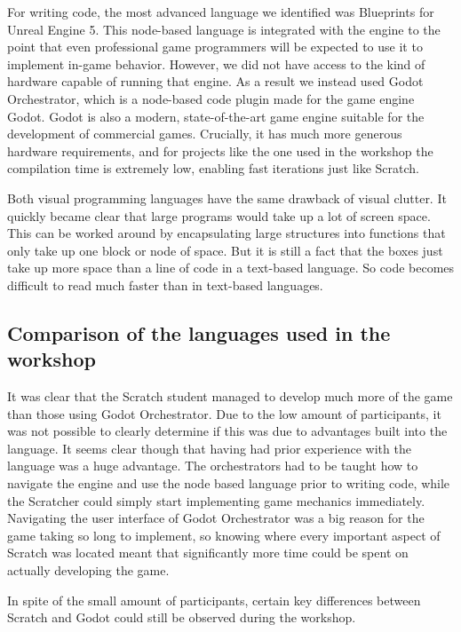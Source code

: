 For writing code, the most advanced language we identified was Blueprints for Unreal Engine 5.
This node-based language is integrated with the engine to the point that even professional game programmers will be expected to use it to implement in-game behavior.
However, we did not have access to the kind of hardware capable of running that engine.
As a result we instead used Godot Orchestrator, which is a node-based code plugin made for the game engine Godot.
Godot is also a modern, state-of-the-art game engine suitable for the development of commercial games.
Crucially, it has much more generous hardware requirements, and for projects like the one used in the workshop the compilation time is extremely low, enabling fast iterations just like Scratch.

Both visual programming languages have the same drawback of visual clutter.
It quickly became clear that large programs would take up a lot of screen space.
This can be worked around by encapsulating large structures into functions that only take up one block or node of space.
But it is still a fact that the boxes just take up more space than a line of code in a text-based language.
So code becomes difficult to read much faster than in text-based languages.

\subsection{Comparison of the languages used in the workshop}
It was clear that the Scratch student managed to develop much more of the game than those using Godot Orchestrator.
Due to the low amount of participants, it was not possible to clearly determine if this was due to advantages built into the language.
It seems clear though that having had prior experience with the language was a huge advantage.
The orchestrators had to be taught how to navigate the engine and use the node based language prior to writing code, while the Scratcher could simply start implementing game mechanics immediately.
Navigating the user interface of Godot Orchestrator was a big reason for the game taking so long to implement, so knowing where every important aspect of Scratch was located meant that significantly more time could be spent on actually developing the game.

In spite of the small amount of participants, certain key differences between Scratch and Godot could still be observed during the workshop.

